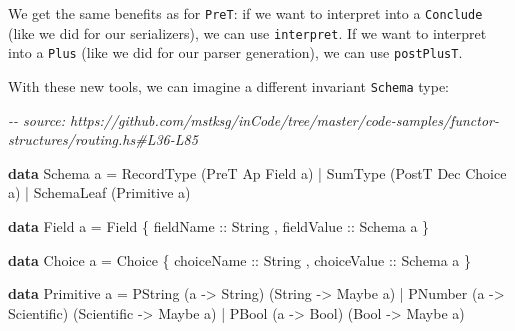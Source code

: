 \documentclass[]{article}
\newenvironment{Shaded}{}{}
\newcommand{\CommentTok}[1]{\textcolor[rgb]{0.38,0.63,0.69}{\textit{#1}}}
\newcommand{\DataTypeTok}[1]{\textcolor[rgb]{0.56,0.13,0.00}{#1}}
\newcommand{\KeywordTok}[1]{\textcolor[rgb]{0.00,0.44,0.13}{\textbf{#1}}}
\newcommand{\NormalTok}[1]{#1}
\newcommand{\OperatorTok}[1]{\textcolor[rgb]{0.40,0.40,0.40}{#1}}
\newcommand{\OtherTok}[1]{\textcolor[rgb]{0.00,0.44,0.13}{#1}}
\begin{document}
We get the same benefits as for \texttt{PreT}: if we want to interpret into a
\texttt{Conclude} (like we did for our serializers), we can use
\texttt{interpret}. If we want to interpret into a \texttt{Plus} (like we did
for our parser generation), we can use \texttt{postPlusT}.

With these new tools, we can imagine a different invariant \texttt{Schema} type:

\begin{Shaded}
\begin{Highlighting}[]
\CommentTok{{-}{-} source: https://github.com/mstksg/inCode/tree/master/code{-}samples/functor{-}structures/routing.hs\#L36{-}L85}

\KeywordTok{data} \DataTypeTok{Schema}\NormalTok{ a }\OtherTok{=}
      \DataTypeTok{RecordType}\NormalTok{  (}\DataTypeTok{PreT}  \DataTypeTok{Ap}  \DataTypeTok{Field}\NormalTok{  a)}
    \OperatorTok{|} \DataTypeTok{SumType}\NormalTok{     (}\DataTypeTok{PostT} \DataTypeTok{Dec} \DataTypeTok{Choice}\NormalTok{ a)}
    \OperatorTok{|} \DataTypeTok{SchemaLeaf}\NormalTok{  (}\DataTypeTok{Primitive}\NormalTok{ a)}

\KeywordTok{data} \DataTypeTok{Field}\NormalTok{ a }\OtherTok{=} \DataTypeTok{Field}
\NormalTok{    \{}\OtherTok{ fieldName  ::} \DataTypeTok{String}
\NormalTok{    ,}\OtherTok{ fieldValue ::} \DataTypeTok{Schema}\NormalTok{ a}
\NormalTok{    \}}

\KeywordTok{data} \DataTypeTok{Choice}\NormalTok{ a }\OtherTok{=} \DataTypeTok{Choice}
\NormalTok{    \{}\OtherTok{ choiceName  ::} \DataTypeTok{String}
\NormalTok{    ,}\OtherTok{ choiceValue ::} \DataTypeTok{Schema}\NormalTok{ a}
\NormalTok{    \}}

\KeywordTok{data} \DataTypeTok{Primitive}\NormalTok{ a }\OtherTok{=}
      \DataTypeTok{PString}\NormalTok{ (a }\OtherTok{{-}\textgreater{}} \DataTypeTok{String}\NormalTok{)     (}\DataTypeTok{String}     \OtherTok{{-}\textgreater{}} \DataTypeTok{Maybe}\NormalTok{ a)}
    \OperatorTok{|} \DataTypeTok{PNumber}\NormalTok{ (a }\OtherTok{{-}\textgreater{}} \DataTypeTok{Scientific}\NormalTok{) (}\DataTypeTok{Scientific} \OtherTok{{-}\textgreater{}} \DataTypeTok{Maybe}\NormalTok{ a)}
    \OperatorTok{|} \DataTypeTok{PBool}\NormalTok{   (a }\OtherTok{{-}\textgreater{}} \DataTypeTok{Bool}\NormalTok{)       (}\DataTypeTok{Bool}       \OtherTok{{-}\textgreater{}} \DataTypeTok{Maybe}\NormalTok{ a)}


\end{Highlighting}
\end{Shaded}
\end{document}
